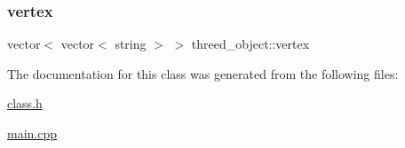 \mbox{\label{classthreed__object_aa5bbbe19ab4af6aedb71f4bf14b226c4}} 
\subsubsection{\texorpdfstring{vertex}{vertex}}
{\footnotesize\ttfamily vector$<$ vector$<$ string $>$ $>$ threed\+\_\+object\+::vertex}



The documentation for this class was generated from the following files\+:\begin{DoxyCompactItemize}
\item 
\mbox{\hyperlink{class_8h}{class.\+h}}\item 
\mbox{\hyperlink{main_8cpp}{main.\+cpp}}\end{DoxyCompactItemize}
